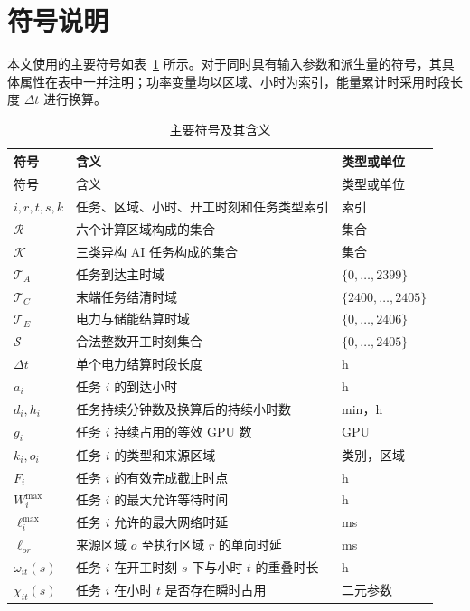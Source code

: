 \section{符号说明}

本文使用的主要符号如表~\ref{tab:symbols} 所示。对于同时具有输入参数和派生量的符号，其具体属性在表中一并注明；功率变量均以区域、小时为索引，能量累计时采用时段长度 $\Delta t$ 进行换算。

{\scriptsize
\renewcommand{\arraystretch}{0.88}
\setlength{\tabcolsep}{3pt}
\begin{longtable}{lll}
\caption{主要符号及其含义}
\label{tab:symbols}\\
\toprule
符号 & 含义 & 类型或单位 \\
\midrule
\endfirsthead
\toprule
符号 & 含义 & 类型或单位 \\
\midrule
\endhead
\bottomrule
\endfoot
$i,r,t,s,k$ & 任务、区域、小时、开工时刻和任务类型索引 & 索引 \\
$\mathcal R$ & 六个计算区域构成的集合 & 集合 \\
$\mathcal K$ & 三类异构 AI 任务构成的集合 & 集合 \\
$\mathcal T_A$ & 任务到达主时域 & $\{0,\ldots,2399\}$ \\
$\mathcal T_C$ & 末端任务结清时域 & $\{2400,\ldots,2405\}$ \\
$\mathcal T_E$ & 电力与储能结算时域 & $\{0,\ldots,2406\}$ \\
$\mathcal S$ & 合法整数开工时刻集合 & $\{0,\ldots,2405\}$ \\
$\Delta t$ & 单个电力结算时段长度 & h \\
$a_i$ & 任务 $i$ 的到达小时 & h \\
$d_i,h_i$ & 任务持续分钟数及换算后的持续小时数 & min，h \\
$g_i$ & 任务 $i$ 持续占用的等效 GPU 数 & GPU \\
$k_i,o_i$ & 任务 $i$ 的类型和来源区域 & 类别，区域 \\
$F_i$ & 任务 $i$ 的有效完成截止时点 & h \\
$W_i^{\max}$ & 任务 $i$ 的最大允许等待时间 & h \\
$\ell_i^{\max}$ & 任务 $i$ 允许的最大网络时延 & ms \\
$\ell_{or}$ & 来源区域 $o$ 至执行区域 $r$ 的单向时延 & ms \\
$\omega_{it}(s)$ & 任务 $i$ 在开工时刻 $s$ 下与小时 $t$ 的重叠时长 & h \\
$\chi_{it}(s)$ & 任务 $i$ 在小时 $t$ 是否存在瞬时占用 & 二元参数 \\

\end{longtable}}
